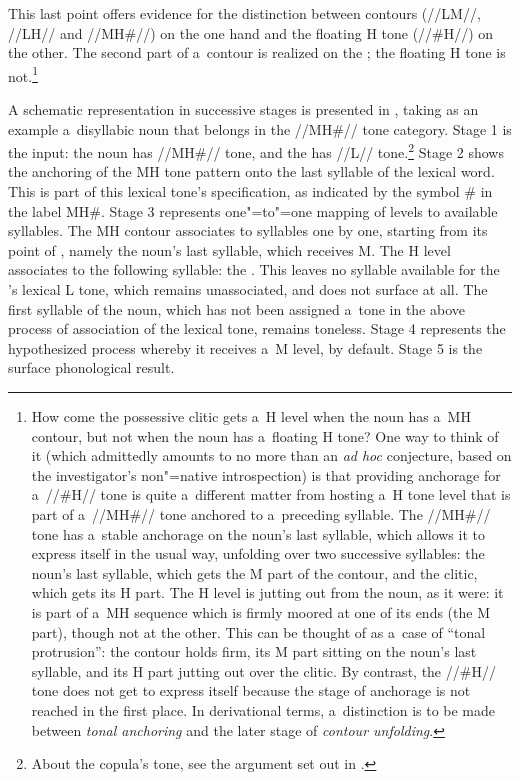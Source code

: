 {{{{{This last point offers evidence for the distinction between contours (\mbox{//LM//}, \mbox{//LH//} and
\mbox{//MH\#//}) on the one hand and the floating H tone (\mbox{//\#H//}) on the other. The second part of
a~contour is realized on the ; the floating H tone is not.\footnote{How come the {possessive} {clitic} gets a~H level when the noun has a~MH {contour}, but not when the noun has a~floating H tone? One way to think of it (which admittedly amounts to no more than an \textit{ad hoc} conjecture, based on the investigator's non"=native introspection) is that providing {anchorage} for a~\mbox{//\#H//} tone is quite a~different matter from hosting a~H tone level that is part of a~\mbox{//MH\#//} tone {anchored} to a~preceding syllable. The \mbox{//MH\#//} tone has a~stable {anchorage} on the noun's last syllable, which allows it to express itself in the usual way, unfolding over two successive syllables: the noun's last syllable, which gets the M part of the {contour}, and the {clitic}, which gets its H part. The H level is jutting out from the noun, as it were: it is part of a~MH sequence which is firmly moored at one of its ends (the M part), though not at the other. This can be thought of as a~case of “tonal protrusion”: the {contour} holds firm, its M part sitting on the noun's last syllable, and its H part jutting out over the {clitic}. By contrast, the \mbox{//\#H//} tone does not get to express itself because the stage of {anchorage} is not reached in the first place. In derivational terms, a~distinction is to be made between \textit{tonal anchoring} and the later stage of \textit{{contour} unfolding}.}

A schematic representation in successive stages is presented in , taking as an example a~disyllabic noun that belongs in the \mbox{//MH\#//} tone category. Stage 1 is the input: the noun has \mbox{//MH\#//} tone, and the  has //L// tone.\footnote{About the {copula}'s tone, see the argument set out in .} Stage 2 shows the anchoring of the MH tone pattern onto the last syllable of the lexical word. This is part of this lexical tone's specification, as indicated by the symbol \# in the label MH\#. Stage 3 represents one"=to"=one mapping of levels to available syllables. The MH contour associates to syllables one by one, starting from its point of , namely the noun’s last syllable, which receives M. The H level associates to the following syllable: the . This leaves no syllable available for the ’s lexical L tone, which remains unassociated, and does not surface at all. The first syllable of the noun, which has not been assigned a~tone in the above process of association of the lexical tone, remains toneless. Stage 4 represents the hypothesized process whereby it receives a~M level, by default. Stage 5 is the surface phonological result. 

}}}}}
